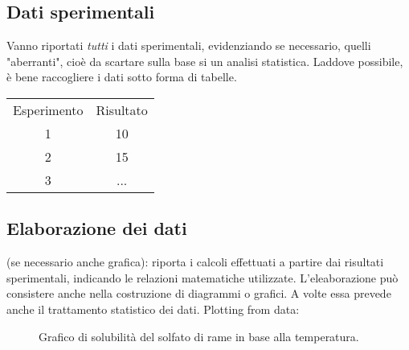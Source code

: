 \subsection{Dati sperimentali}
Vanno riportati \textit{tutti} i dati sperimentali, evidenziando se necessario, quelli "aberranti", cioè da scartare sulla base si un analisi statistica. Laddove possibile, è bene raccogliere i dati sotto forma di tabelle.
\vspace{1ex}
\begin {center}
\begin{tabular}{c|c}
     Esperimento &  Risultato\\
     1 & 10\\
     2 & 15\\
     3 & ...
\end{tabular}
\end {center}

\subsection{Elaborazione dei dati}
(se necessario anche grafica): riporta i calcoli effettuati a partire dai risultati sperimentali, indicando le relazioni matematiche utilizzate. L'eleaborazione può consistere anche nella costruzione di diagrammi o grafici. A volte essa prevede anche il trattamento statistico dei dati.
Plotting from data:
\begin{center}
\vspace{2ex}
\begin{figure}[!ht]
    \centering
    \caption{Grafico di solubilità del solfato di rame in base alla temperatura.}
    \label{plt:1}
\end{figure}

\end{center}
\newpage

